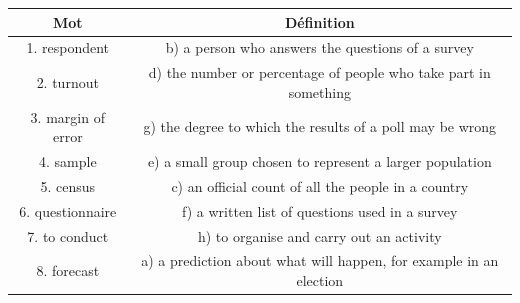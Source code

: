 \documentclass[11pt]{article}
\begin{document}
\begin{corrige}
\begin{center}
\begin{tabular}{|c|c|}
\hline
\textbf{Mot} & \textbf{Définition} \\
\hline
1. respondent & b) a person who answers the questions of a survey \\
2. turnout & d) the number or percentage of people who take part in something \\
3. margin of error & g) the degree to which the results of a poll may be wrong \\
4. sample & e) a small group chosen to represent a larger population \\
5. census & c) an official count of all the people in a country \\
6. questionnaire & f) a written list of questions used in a survey \\
7. to conduct & h) to organise and carry out an activity \\
8. forecast & a) a prediction about what will happen, for example in an election \\
\hline
\end{tabular}
\end{center}
\end{corrige}
\end{document}
